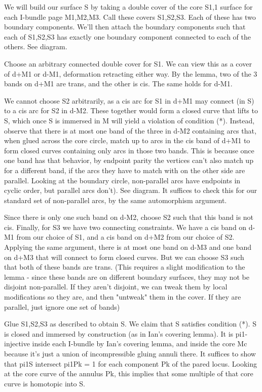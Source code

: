 \documentclass[12pt]{amsart}
\theoremstyle{definition}
\begin{document}
We will build our surface S by taking a double cover of the core S1,1 surface
for each I-bundle page M1,M2,M3. Call these covers S1,S2,S3. Each of these has
two boundary components. We'll then attach the boundary components such that
each of S1,S2,S3 has exactly one boundary component connected to each of the
others.  See diagram.

Choose an arbitrary connected double cover for S1. We can view this as a cover
of d+M1 or d-M1, deformation retracting either way. By the lemma, two of the
3 bands on d+M1 are trans, and the other is cis. The same holds for d-M1.

We cannot choose S2 arbitrarily, as a cis arc for S1 in d+M1 may connect (in S)
to a cis arc for S2 in d-M2. These together would form a closed curve that
lifts to S, which once S is immersed in M will yield a violation of condition
(*). Instead, observe that there is at most one band of the three in d-M2
containing arcs that, when glued across the core circle, match up to arcs in
the cis band of d+M1 to form closed curves containing only arcs in those two
bands. This is because once one band has that behavior, by endpoint parity the
vertices can't also match up for a different band, if the arcs they have to
match with on the other side are parallel. Looking at the boundary circle,
non-parallel arcs have endpoints in cyclic order, but parallel arcs don't). See
diagram. It suffices to check this for our standard set of non-parallel arcs,
by the same automorphism argument.

Since there is only one such band on d-M2, choose S2 such that this band is not
cis.  Finally, for S3 we have two connecting constraints. We have a cis band on
d-M1 from our choice of S1, and a cis band on d+M2 from our choice of S2.
Applying the same argument, there is at most one band on d-M3 and one band on
d+M3 that will connect to form closed curves. But we can choose S3 such that
both of these bands are trans. (This requires a slight modification to the
lemma - since these bands are on different boundary surfaces, they may not be
disjoint non-parallel. If they aren't disjoint, we can tweak them by local
modifications so they are, and then "untweak" them in the cover. If they are
parallel, just ignore one set of bands)

Glue S1,S2,S3 as described to obtain S. We claim that S satisfies condition
(*). S is closed and immersed by construction (as in Ian's covering lemma). It
is pi1-injective inside each I-bundle by Ian's covering lemma, and inside the
core Mc because it's just a union of incompressible gluing annuli there. It
suffices to show that pi1S intersect pi1Pk = 1 for each component Pk of the
pared locus. Looking at the core curve of the annulus Pk, this implies that
some multiple of that core curve is homotopic into S.
\end{document}
